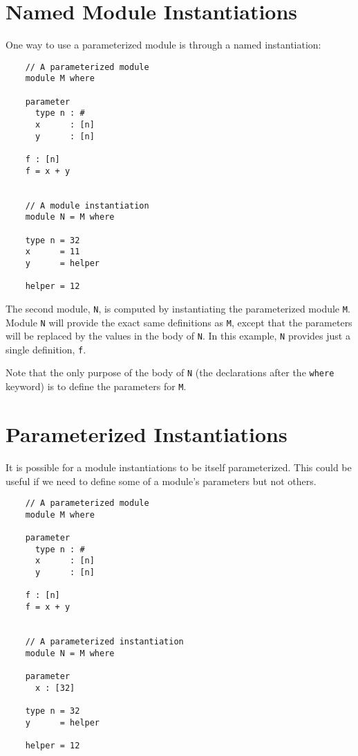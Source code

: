\section{Named Module Instantiations}

One way to use a parameterized module is through a named instantiation:

\begin{verbatim}
    // A parameterized module
    module M where

    parameter
      type n : #
      x      : [n]
      y      : [n]

    f : [n]
    f = x + y


    // A module instantiation
    module N = M where

    type n = 32
    x      = 11
    y      = helper

    helper = 12
\end{verbatim}

The second module, \texttt{N}, is computed by instantiating the parameterized
module \texttt{M}.  Module \texttt{N} will provide the exact same definitions as \texttt{M},
except that the parameters will be replaced by the values in the body
of \texttt{N}.   In this example, \texttt{N} provides just a single definition, \texttt{f}.

Note that the only purpose of the body of \texttt{N} (the declarations
after the \texttt{where} keyword) is to define the parameters for \texttt{M}.


\section{Parameterized Instantiations}

It is possible for a module instantiations to be itself parameterized.
This could be useful if we need to define some of a module's parameters
but not others.


\begin{verbatim}
    // A parameterized module
    module M where

    parameter
      type n : #
      x      : [n]
      y      : [n]

    f : [n]
    f = x + y


    // A parameterized instantiation
    module N = M where

    parameter
      x : [32]

    type n = 32
    y      = helper

    helper = 12
\end{verbatim}


